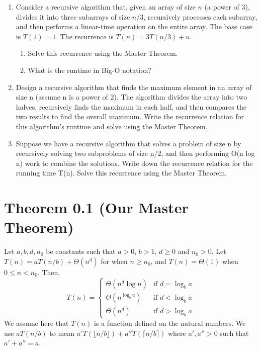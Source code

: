 \documentclass{article}
\begin{document}
\begin{enumerate}
    \item Consider a recursive algorithm that, given an array of size $n$ (a power of 3), divides it into three subarrays of size $n/3$, recursively processes each subarray, and then performs a linear-time operation on the entire array.  The base case is $T(1) = 1$.  The recurrence is $T(n) = 3T(n/3) + n$.
    \begin{enumerate}
        \item Solve this recurrence using the Master Theorem.
        \item What is the runtime in Big-O notation?
    \end{enumerate}

    \item  Design a recursive algorithm that finds the maximum element in an array of size n (assume n is a power of 2). The algorithm divides the array into two halves, recursively finds the maximum in each half, and then compares the two results to find the overall maximum.  Write the recurrence relation for this algorithm's runtime and solve using the Master Theorem.

    \item  Suppose we have a recursive algorithm that solves a problem of size n by recursively solving two subproblems of size n/2, and then performing O(n log n) work to combine the solutions. Write down the recurrence relation for the running time T(n).  Solve this recurrence using the Master Theorem.
\end{enumerate}

\section*{Theorem 0.1 (Our Master Theorem)}
Let $a, b, d, n_0$ be constants such that $a > 0$, $b > 1$, $d \geq 0$ and $n_0 > 0$.
Let $T(n) = aT(n/b) + \Theta(n^d)$ for when $n \geq n_0$, and $T(n) = \Theta(1)$ when $0 \leq n < n_0$. Then,
\[
T(n) = \begin{cases}
\Theta(n^d \log n) & \text{if } d = \log_b a \\
\Theta(n^{\log_b a}) & \text{if } d < \log_b a \\
\Theta(n^d) & \text{if } d > \log_b a
\end{cases}
\]
We assume here that $T(n)$ is a function defined on the natural numbers. We use $aT(n/b)$ to mean $a'T(\lfloor n/b \rfloor) + a''T(\lceil n/b \rceil)$ where $a', a'' > 0$ such that $a' + a'' = a$.
\end{document}
